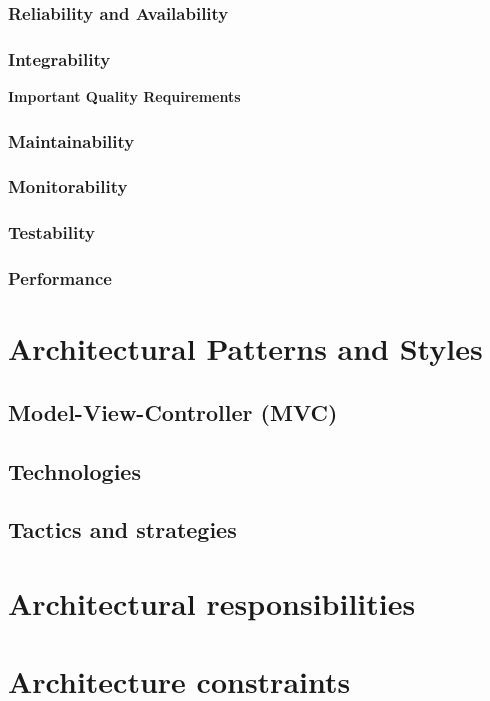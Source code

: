 \documentclass[a4paper,12pt,titlepage]{article}
\begin{document}
		\subsubsection{Reliability and Availability}
			
			
		\subsubsection{Integrability}
			



\textbf{\LARGE Important Quality Requirements}
			
		\subsubsection{Maintainability}
			
			
		\subsubsection{Monitorability}
			
			
		\subsubsection{Testability}
			
			
		\subsubsection{Performance}

\section{Architectural Patterns and Styles}
	\subsection{Model-View-Controller (MVC)}
	
	
	\subsection{Technologies}
	
	
	\subsection{Tactics and strategies}
	
\section{Architectural responsibilities}
\section{Architecture constraints}


\end{document}
